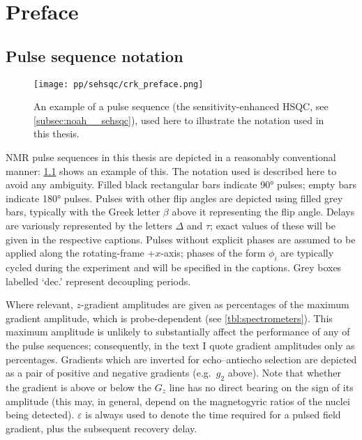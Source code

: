 \chapter{Preface}

\section*{Pulse sequence notation}

\begin{figure}[ht]
    \centering
    \texttt{[image: pp/sehsqc/crk\_preface.png]}%
    \caption[Example pulse sequence to illustrate notation]{An example of a pulse sequence (the sensitivity-enhanced HSQC, see \cref{subsec:noah__sehsqc}), used here to illustrate the notation used in this thesis.}
    \label{fig:preface_sehsqc}
\end{figure}

NMR pulse sequences in this thesis are depicted in a reasonably conventional manner: \cref{fig:preface_sehsqc} shows an example of this.
The notation used is described here to avoid any ambiguity.
Filled black rectangular bars indicate \ang{90} pulses; empty bars indicate \ang{180} pulses.
Pulses with other flip angles are depicted using filled grey bars, typically with the Greek letter $\beta$ above it representing the flip angle.
Delays are variously represented by the letters $\Delta$ and $\tau$; exact values of these will be given in the respective captions.
Pulses without explicit phases are assumed to be applied along the rotating-frame $+x$-axis; phases of the form $\phi_i$ are typically cycled during the experiment and will be specified in the captions.
Grey boxes labelled `dec.' represent decoupling periods.

Where relevant, $z$-gradient amplitudes are given as percentages of the maximum gradient amplitude, which is probe-dependent (see \cref{tbl:spectrometers}).
This maximum amplitude is unlikely to substantially affect the performance of any of the pulse sequences; consequently, in the text I quote gradient amplitudes only as percentages.
Gradients which are inverted for echo--antiecho selection are depicted as a pair of positive and negative gradients (e.g.\ $g_2$ above).
Note that whether the gradient is above or below the $G_z$ line has no direct bearing on the sign of its amplitude (this may, in general, depend on the magnetogyric ratios of the nuclei being detected).
$\varepsilon$ is always used to denote the time required for a pulsed field gradient, plus the subsequent recovery delay.

